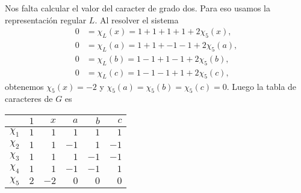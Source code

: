 \begin{example}
	Nos falta calcular el valor del caracter de grado dos. Para eso usamos la
	representación regular $L$. Al resolver el sistema 
	\begin{align*}
		0&=\chi_L(x)=1+1+1+1+2\chi_5(x),\\
		0&=\chi_L(a)=1+1+-1-1+2\chi_5(a),\\
		0&=\chi_L(b)=1-1+1-1+2\chi_5(b),\\
		0&=\chi_L(c)=1-1-1+1+2\chi_5(c),
	\end{align*}
	obtenemos $\chi_5(x)=-2$ y $\chi_5(a)=\chi_5(b)=\chi_5(c)=0$. Luego la
	tabla de caracteres de $G$ es 
	\begin{center}
		\begin{tabular}{|c|rrrrr|}
			\hline
			& $1$ & $x$ & $a$ & $b$ & $c$\tabularnewline
			\hline
			$\chi_1$ & $1$ & $1$ & $1$ & $1$ & $1$\tabularnewline
			$\chi_2$ & $1$ & $1$ & $-1$ & $1$ & $-1$\tabularnewline
			$\chi_3$ & $1$ & $1$ & $1$ & $-1$ & $-1$\tabularnewline
			$\chi_4$ & $1$ & $1$ & $-1$ & $-1$ & $1$\tabularnewline
			$\chi_5$ & $2$ & $-2$ & $0$ & $0$ & $0$\tabularnewline
			\hline
		\end{tabular}
	\end{center}
\end{example}



